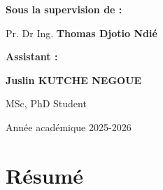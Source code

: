 \documentclass[11pt,a4paper,oneside]{report}
\begin{document}
\begin{titlepage}
\begin{center}
\begin{tabular}{l c c}
			\bottomrule[0.6pt]
		\end{tabular}
	\end{center}
	
	\vspace{0.3cm}
	
	\begin{flushright}
		{ \bfseries \color{bcblue} \large Sous la supervision de :}
		
		\vspace{0.05cm}
		{  Pr. Dr Ing. \textbf{Thomas Djotio Ndié}}
		
		\vspace{0.2cm}
		
		{  \bfseries \color{bcblue} Assistant :}
		
		\vspace{0.05cm}
		{ \textbf{Juslin KUTCHE NEGOUE}}
		
		\vspace{0.05cm}
		{\small MSc, PhD Student}
	\end{flushright}
	
	\vfill
	
	\begin{center}
		{\small Année académique 2025-2026} 
	\end{center}
	
	\restoregeometry
	
\end{titlepage}


\chapter*{Résumé}
\end{document}
